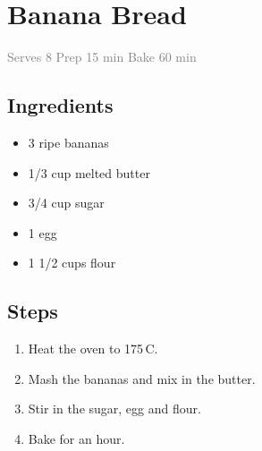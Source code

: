 \documentclass{article}
\begin{document}
\section*{Banana Bread}
\textcolor{gray}{Serves 8 \quad Prep 15 min \quad Bake 60 min}

\subsection*{Ingredients}
\begin{itemize}[noitemsep]
  \item 3 ripe bananas
  \item 1/3 cup melted butter
  \item 3/4 cup sugar
  \item 1 egg
  \item 1 1/2 cups flour
\end{itemize}

\subsection*{Steps}
\begin{enumerate}
  \item Heat the oven to 175\,\textdegree C.
  \item Mash the bananas and mix in the butter.
  \item Stir in the sugar, egg and flour.
  \item Bake for an hour.
\end{enumerate}
\end{document}
